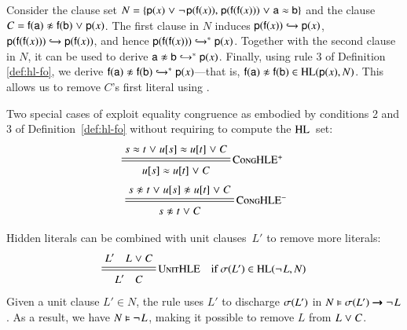 \begin{exa}
   \label{example:hle}
   Consider the clause set $N = \{ \cst{p}(x) \cor \neglit{\cst{p}(\cst{f}(x))}{,}\;
   \cst{p}(\cst{f}(\cst{f}(x))) \cor \eqlit{\cst{a}}{\cst{b}} \}$ and the clause
   $C = \neqlit{\cst{f}(\cst{a})}{\cst{f}(\cst{b})} \cor \cst{p}(x)$. The first
   clause in $N$ induces $\cst{p}(\cst{f}(x)) \bigfimpl{N} {\cst{p}(x)}$,
   $\cst{p}(\cst{f}(\cst{f}(x))) \bigfimpl{N} \cst{p}(\cst{f}(x))$, and
   hence $\cst{p}(\cst{f}(\cst{f}(x))) \bigfimpl{N}^\ast  \cst{p}(x)$.
   Together with the second clause in $N$, it can be used to derive $\neqlit{\cst{a}}{\cst{b}}
   \bigfimpl{N}^\ast  \cst{p}(x)$. Finally, using rule 3 of Definition
   \ref{def:hl-fo}, we derive $\neqlit{\cst{f}(\cst{a})}{\cst{f}(\cst{b})}
   \bigfimpl{N}^\ast  \cst{p}(x)$---that is,
   $\neqlit{\cst{f}(\cst{a})}{\cst{f}(\cst{b})} \in \HL(\cst{p}(x), N)$. This
   allows us to remove $C$'s first literal using .
\end{exa}

Two special cases of  exploit equality congruence as embodied by
conditions 2 and 3 of Definition~\ref{def:hl-fo} without requiring to
compute the $\HL$~set:
\begin{align*}
  \namedsimp{CongHLE$^+$}{\eqlit{s}{t} \cor \eqlit{u[s]}{u[t]} \cor C}{\eqlit{u[s]}{u[t]} \cor C}\,\, \\[.5\jot]
  \namedsimp{CongHLE$^-$}{\neqlit{s}{t} \cor \neqlit{u[s]}{u[t]} \cor C}{\neqlit{s}{t} \cor C}
\end{align*}%

Hidden literals can be combined with unit clauses~$L'$ to remove more literals:
\[\namedsimpsc{UnitHLE}{L' \quad L \cor C}{L' \quad C}{\sigmaterm{L'} \in \HL(\neglit{L},N)}
\]
%
Given a unit clause $L' \in N$, the rule uses $L'$ to discharge $\sigmaterm{L'}$ in
$N \models \sigmaterm{L'} \impl \neglit{L}$. As a result, we have $N \models
\neglit{L}$, making it possible to remove $L$ from $L \cor C$.


